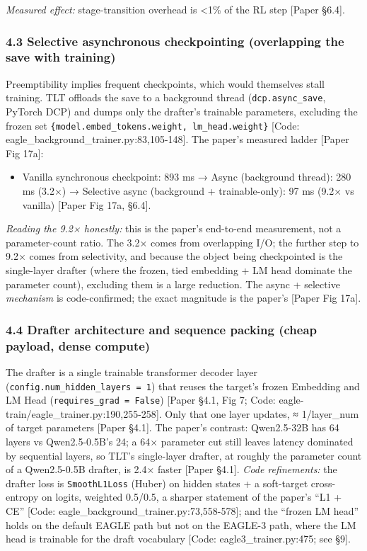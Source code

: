 \documentclass[
  11pt,
  letterpaper,
]{article}
\providecommand{\tightlist}{%
  \setlength{\itemsep}{0pt}\setlength{\parskip}{0pt}}
\begin{document}
\emph{Measured effect:} stage-transition overhead is \textless1\% of the
RL step {[}Paper §6.4{]}.

\subsubsection{4.3 Selective asynchronous checkpointing (overlapping the
save with
training)}\label{selective-asynchronous-checkpointing-overlapping-the-save-with-training}

Preemptibility implies frequent checkpoints, which would themselves
stall training. TLT offloads the save to a background thread
(\texttt{dcp.async\_save}, PyTorch DCP) and dumps only the drafter's
trainable parameters, excluding the frozen set
\texttt{\{model.embed\_tokens.weight,\ lm\_head.weight\}} {[}Code:
eagle\_background\_trainer.py:83,105-148{]}. The paper's measured ladder
{[}Paper Fig 17a{]}:

\begin{itemize}
\tightlist
\item
  Vanilla synchronous checkpoint: 893 ms → Async (background thread):
  280 ms (3.2×) → Selective async (background + trainable-only): 97 ms
  (9.2× vs vanilla) {[}Paper Fig 17a, §6.4{]}.
\end{itemize}

\emph{Reading the 9.2× honestly:} this is the paper's end-to-end
measurement, not a parameter-count ratio. The 3.2× comes from
overlapping I/O; the further step to 9.2× comes from selectivity, and
because the object being checkpointed is the single-layer drafter (where
the frozen, tied embedding + LM head dominate the parameter count),
excluding them is a large reduction. The async + selective
\emph{mechanism} is code-confirmed; the exact magnitude is the paper's
{[}Paper Fig 17a{]}.

\subsubsection{4.4 Drafter architecture and sequence packing (cheap
payload, dense
compute)}\label{drafter-architecture-and-sequence-packing-cheap-payload-dense-compute}

The drafter is a single trainable transformer decoder layer
(\texttt{config.num\_hidden\_layers\ =\ 1}) that reuses the target's
frozen Embedding and LM Head (\texttt{requires\_grad\ =\ False})
{[}Paper §4.1, Fig 7; Code:
eagle-train/eagle\_trainer.py:190,255-258{]}. Only that one layer
updates, ≈ 1/layer\_num of target parameters {[}Paper §4.1{]}. The
paper's contrast: Qwen2.5-32B has 64 layers vs Qwen2.5-0.5B's 24; a 64×
parameter cut still leaves latency dominated by sequential layers, so
TLT's single-layer drafter, at roughly the parameter count of a
Qwen2.5-0.5B drafter, is 2.4× faster {[}Paper §4.1{]}. \emph{Code
refinements:} the drafter loss is \texttt{SmoothL1Loss} (Huber) on
hidden states + a soft-target cross-entropy on logits, weighted 0.5/0.5,
a sharper statement of the paper's ``L1 + CE'' {[}Code:
eagle\_background\_trainer.py:73,558-578{]}; and the ``frozen LM head''
holds on the default EAGLE path but not on the EAGLE-3 path, where the
LM head is trainable for the draft vocabulary {[}Code:
eagle3\_trainer.py:475; see §9{]}.
\end{document}
